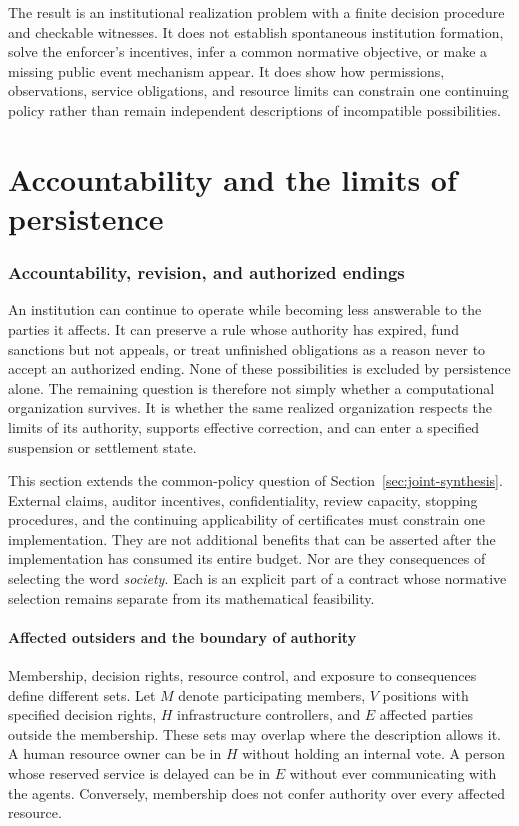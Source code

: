 \documentclass[11pt,letterpaper]{article}
\theoremstyle{plain}
\theoremstyle{definition}
\theoremstyle{remark}
\begin{document}
The result is an institutional realization problem with a finite decision procedure and checkable witnesses. It does not establish spontaneous institution formation, solve the enforcer's incentives, infer a common normative objective, or make a missing public event mechanism appear. It does show how permissions, observations, service obligations, and resource limits can constrain one continuing policy rather than remain independent descriptions of incompatible possibilities.
\FloatBarrier

\FloatBarrier
\clearpage\part{Accountability and the limits of persistence}
\section{Accountability, revision, and authorized endings}\label{sec:accountability}

An institution can continue to operate while becoming less answerable to the parties it affects. It can preserve a rule whose authority has expired, fund sanctions but not appeals, or treat unfinished obligations as a reason never to accept an authorized ending. None of these possibilities is excluded by persistence alone. The remaining question is therefore not simply whether a computational organization survives. It is whether the same realized organization respects the limits of its authority, supports effective correction, and can enter a specified suspension or settlement state.

This section extends the common-policy question of Section~\ref{sec:joint-synthesis}. External claims, auditor incentives, confidentiality, review capacity, stopping procedures, and the continuing applicability of certificates must constrain one implementation. They are not additional benefits that can be asserted after the implementation has consumed its entire budget. Nor are they consequences of selecting the word \emph{society}. Each is an explicit part of a contract whose normative selection remains separate from its mathematical feasibility.

\subsection{Affected outsiders and the boundary of authority}\label{sec:external-effects}

Membership, decision rights, resource control, and exposure to consequences define different sets. Let $M$ denote participating members, $V$ positions with specified decision rights, $H$ infrastructure controllers, and $E$ affected parties outside the membership. These sets may overlap where the description allows it. A human resource owner can be in $H$ without holding an internal vote. A person whose reserved service is delayed can be in $E$ without ever communicating with the agents. Conversely, membership does not confer authority over every affected resource.
\end{document}
